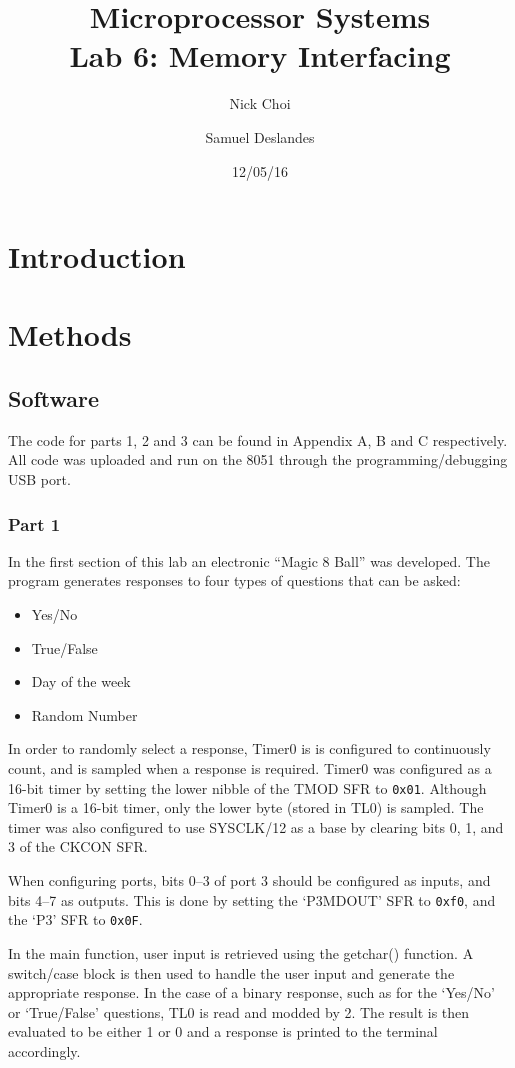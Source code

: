 \documentclass[12pt]{article}
\begin{document}
\title{Microprocessor Systems\\ Lab 6: Memory Interfacing }
\author{Nick Choi \and Samuel Deslandes}
\date{12/05/16}
\maketitle
\pagebreak
\section{Introduction}


\section{Methods}
\subsection{Software}
The code for parts 1, 2 and 3 can be found in Appendix A, B and C respectively. All code was uploaded and run on the 8051 through the programming/debugging USB port. 

\subsubsection{Part 1}
In the first section of this lab an electronic ``Magic 8 Ball'' was developed. The program generates responses to four types of questions that can be asked:
	\begin{itemize}
		\item Yes/No
		\item True/False
		\item Day of the week
		\item Random Number
	\end{itemize}

In order to randomly select a response, Timer0 is is configured to continuously count, and is sampled when a response is required. Timer0 was configured as a 16-bit timer by setting the lower nibble of the TMOD SFR to \texttt{0x01}. Although Timer0 is a 16-bit timer, only the lower byte (stored in TL0) is sampled. The timer was also configured to use SYSCLK/12 as a base by clearing bits 0, 1, and 3 of the CKCON SFR. 

When configuring ports, bits 0--3 of port 3 should be configured as inputs, and bits 4--7 as outputs. This is done by setting the `P3MDOUT' SFR to \texttt{0xf0}, and the `P3' SFR to \texttt{0x0F}.

In the main function, user input is retrieved using the getchar() function. A switch/case block is then used to handle the user input and generate the appropriate response. In the case of a binary response, such as for the `Yes/No' or `True/False' questions, TL0 is read and modded by 2. The result is then evaluated to be either 1 or 0 and a response is printed to the terminal accordingly. 
\end{document}
